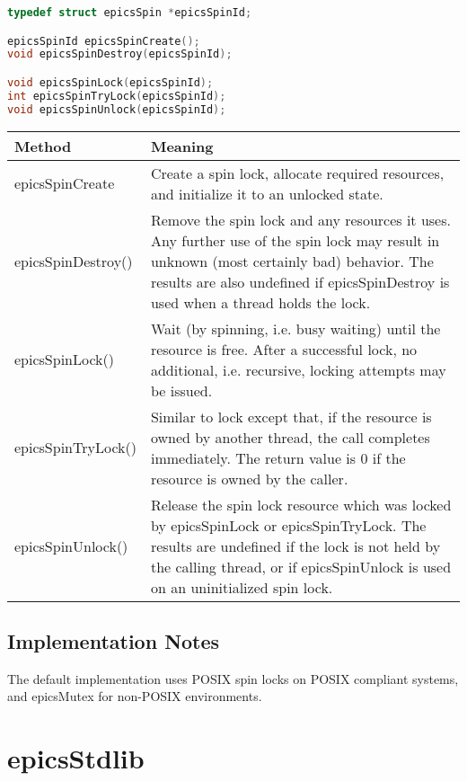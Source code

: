 \begin{lstlisting}[language=C]
typedef struct epicsSpin *epicsSpinId;

epicsSpinId epicsSpinCreate();
void epicsSpinDestroy(epicsSpinId);

void epicsSpinLock(epicsSpinId);
int epicsSpinTryLock(epicsSpinId);
void epicsSpinUnlock(epicsSpinId);
\end{lstlisting}

\begin{center}
\begin{longtable}{p{1.38889in}p{5.0in}}
\textbf{Method} & \textbf{Meaning}\\
\hline
epicsSpinCreate & Create a spin lock, allocate required resources, and initialize it to an unlocked state.\\
epicsSpinDestroy() & Remove the spin lock and any resources it uses. Any further use of the spin lock may result in unknown (most certainly bad) behavior. The results are also undefined if epicsSpinDestroy is used when a thread holds the lock.\\
epicsSpinLock() & Wait (by spinning, i.e. busy waiting) until the resource is free. After a successful lock, no additional, i.e. recursive, locking attempts may be issued.\\
epicsSpinTryLock() & Similar to lock except that, if the resource is owned by another thread, the call completes immediately. The return value is 0 if the resource is owned by the caller.\\
epicsSpinUnlock() & Release the spin lock resource which was locked by epicsSpinLock or epicsSpinTryLock. The results are undefined if the lock is not held by the calling thread, or if epicsSpinUnlock is used on an uninitialized spin lock.\\
\end{longtable}
\end{center}

\subsection{Implementation Notes}

The default implementation uses POSIX spin locks on POSIX compliant systems, and epicsMutex for non-POSIX environments.


\section{epicsStdlib}

